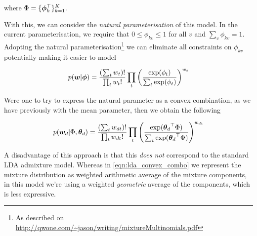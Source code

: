 where $\Phi = \{\bm \phi_k^\top\}_{k=1}^{K}$.

With this, we can consider the \emph{natural parameterisation} of this model. In the current parameterisation, we require that $0 \leq \phi_{kv} \leq 1$ for all $v$ and $\sum_v \phi_{kv} = 1$. Adopting the natural parameterisation\footnote{As described on \url{http://qwone.com/~jason/writing/mixtureMultinomials.pdf}} we can eliminate all constraints on $\phi_{kv}$ potentially making it easier to model

\begin{align}
p(\bm w|\bm \phi) = \frac{(\sum_t w_t)!}{\prod_t w_t !} 
\prod_t \left(   
    \frac{\exp(\phi_t)}{\sum_t \exp(\phi_t)}
\right)^{w_t}
\end{align}

Were one to try to express the natural parameter as a convex combination, as we have previously with the mean parameter, then we obtain the following

\begin{align}
p({ \bm w_d }|\Phi, { \bm \theta_d }) = \frac{(\sum_t w_{dt})!}{\prod_t w_{dt} !} 
\prod_t \left(   
    \frac{\exp({ \bm \theta_d }^\top\Phi)}{\sum_t \exp({ \bm \theta_d }^\top\Phi)}
\right)^{w_{dt}}
\end{align}

A disadvantage of this approach is that this \emph{does not} correspond to the standard LDA admixture model. Whereas in \eqref{eqn:lda_convex_combo} we represent the mixture distribution as weighted arithmetic average of the mixture components, in this model we're using a weighted \emph{geometric} average of the components, which is less expressive.


